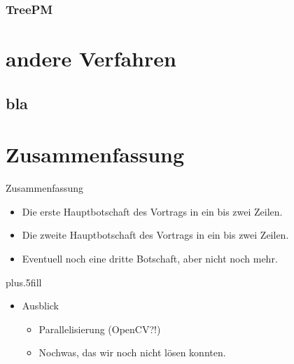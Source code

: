 \documentclass{beamer}
\begin{document}
\subsubsection{TreePM}

\section{andere Verfahren}
\subsection{bla}

\section{Zusammenfassung}
\begin{frame}{Zusammenfassung}

  \begin{itemize}
  \item
    Die \alert{erste Hauptbotschaft} des Vortrags in ein bis zwei Zeilen.
  \item
    Die \alert{zweite Hauptbotschaft} des Vortrags in ein bis zwei Zeilen.
  \item
    Eventuell noch eine \alert{dritte Botschaft}, aber nicht noch mehr.
  \end{itemize}
  
  \vskip0pt plus.5fill
  \begin{itemize}
  \item
    Ausblick
    \begin{itemize}
    \item Parallelisierung (OpenCV?!)
    \item
      Nochwas, das wir noch nicht lösen konnten.
    \end{itemize}
  \end{itemize}
\end{frame}
\end{document}
